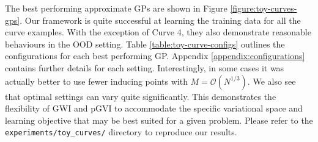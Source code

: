 \documentclass{article}
\def\code#1{\texttt{#1}}
\numberwithin{equation}{section}
\begin{document}
The best performing approximate GPs are shown in Figure \ref{figure:toy-curves-gps}. Our framework is quite successful at learning the training data for all the curve examples.
With the exception of Curve 4, they also demonstrate reasonable behaviours in the OOD setting. 
Table \ref{table:toy-curve-configs} outlines the configurations for each best performing GP. 
Appendix \ref{appendix:configurations} contains further details for each setting.
Interestingly, in some cases it was actually better to use fewer inducing points with $M = \mathcal{O}(N^{1/3})$.
We also see that optimal settings can vary quite significantly.
This demonstrates the flexibility of GWI and pGVI to accommodate the specific variational space and learning objective that may be best suited for a given problem.
Please refer to the \code{experiments/toy\_curves/} directory to reproduce our results.
\end{document}
